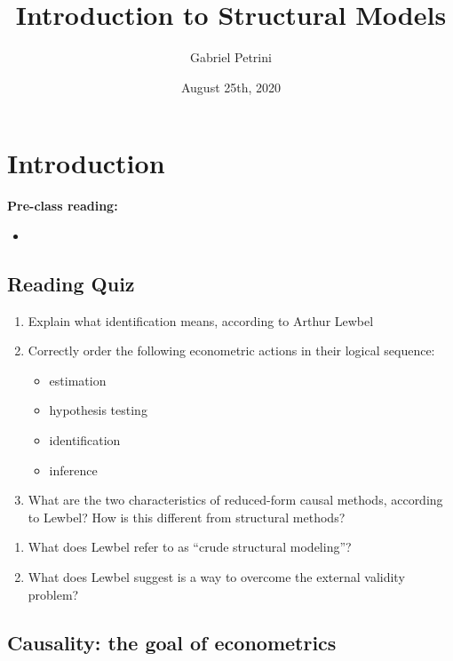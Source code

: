 \documentclass[11pt]{article}
\author{Gabriel Petrini}
\date{August 25th, 2020}
\title{Introduction to Structural Models}
\begin{document}
\maketitle
\tableofcontents



\section{Introduction}
\label{sec:org7a0c69c}


\textbf{Pre-class reading:} 

\begin{itemize}
\item {}
\end{itemize}

\subsection{Reading Quiz}
\label{sec:org91f3d7b}

\begin{enumerate}
\item Explain what identification means, according to Arthur Lewbel

\item Correctly order the following econometric actions in their logical sequence:
\begin{itemize}
\item estimation
\item hypothesis testing
\item identification
\item inference
\end{itemize}

\item What are the two characteristics of reduced-form causal methods, according to Lewbel? How is this different from structural methods?
\end{enumerate}


\begin{enumerate}
\item What does Lewbel refer to as ``crude structural modeling''?

\item What does Lewbel suggest is a way to overcome the external validity problem?
\end{enumerate}


\subsection{Causality: the goal of econometrics}
\label{sec:orgafdb3fa}
\end{document}
